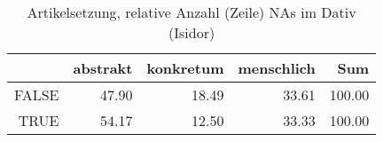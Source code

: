 \begin{table}[ht]
\centering
\begin{tabular}{rrrrr}
  \hline
 & abstrakt & konkretum & menschlich & Sum \\ 
  \hline
FALSE & 47.90 & 18.49 & 33.61 & 100.00 \\ 
  TRUE & 54.17 & 12.50 & 33.33 & 100.00 \\ 
   \hline
\end{tabular}
\caption{Artikelsetzung, relative Anzahl (Zeile) NAs im Dativ (Isidor)} 
\end{table}

